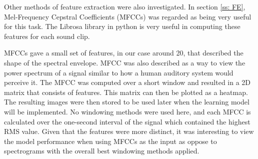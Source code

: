 Other methods of feature extraction were also investigated. In section \ref{ss: FE}, Mel-Frequency Cepstral Coefficients (MFCCs) was regarded as being very useful for this task. The Librosa library in python is very useful in computing these features for each sound clip.  

MFCCs gave a small set of features, in our case around 20, that described the shape of the spectral envelope. MFCC was also described as a way to view the power spectrum of a signal similar to how a human auditory system would perceive it. The MFCC was computed over a short window and resulted in a 2D matrix that consists of features. This matrix can then be plotted as a heatmap. The resulting images were then stored to be used later when the learning model will be implemented. No windowing methods were used here, and each MFCC is calculated over the one-second interval of the signal which contained the highest RMS value. Given that the features were more distinct, it was interesting to view the model performance when using MFCCs as the input as oppose to spectrograms with the overall best windowing methods applied. 


% 
% 
